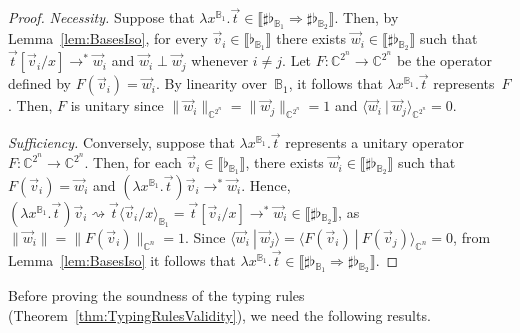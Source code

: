 \documentclass[a4paper,UKenglish,numberwithinsect,pdfa,anonymous]{lipics-v2021}
\theoremstyle{restatestyle}
\newcommand\lra{\longrightarrow}
\newcommand\ansubst[2]{\ensuremath{\langle #1 \rangle_{#2}}}
\def\C{\mathbb{C}}            %
\def\scal#1#2{\langle{#1}~|~{#2}\rangle}
\def\Lam#1#2#3{\lambda#1^{#2}{.}#3} %
\def\lraneq{\rightsquigarrow}
\def\eval{\lra^*}
\def\BB{\mathbb{B}}
\def\Arr{\Rightarrow}
\def\sem#1{\llbracket#1\rrbracket}
\newcommand\basis[1]{\ensuremath{\flat_{#1}}}
\begin{document}
\begin{proof}
  \textit{Necessity.}
  Suppose that $\Lam{x}{{\BB_1}}{\vec{t}}\in\sem{\sharp\basis{\BB_1}\Arr\sharp\basis{\BB_2}}$.
  Then, by Lemma~\ref{lem:BasesIso}, for every
  $\vec{v}_{i}\in\sem{\basis{\BB_1}}$ there exists
  $\vec{w}_{i}\in\sem{\sharp\basis{\BB_2}}$ such that
  $\vec{t}[\vec{v}_{i}/x]\eval\vec{w}_{i}$ and
  $\vec{w}_{i}\perp\vec{w}_{j}$ whenever $i\neq j$.
  Let $F:\C^{2^n}\to\C^{2^n}$ be the operator defined by
  $F(\vec{v}_{i})=\vec{w}_{i}$.
  By linearity over~$\BB_1$, it follows that
  $\Lam{x}{{\BB_1}}{\vec{t}}$ represents~$F$.
  Then, $F$ is unitary since
  $\|\vec{w}_{i}\|_{\C^{2^n}}=\|\vec{w}_{j}\|_{\C^{2^n}}=1$ and
  $\scal{\vec{w}_{i}}{\vec{w}_{j}}_{\C^{2^n}}=0$.

  \smallskip
  \textit{Sufficiency.}
  Conversely, suppose that $\Lam{x}{{\BB_1}}{\vec{t}}$ represents a
  unitary operator $F:\C^{2^n}\to\C^{2^n}$.
  Then, for each $\vec{v}_{i}\in\sem{\basis{\BB_1}}$, there exists
  $\vec{w}_{i}\in\sem{\sharp\basis{\BB_2}}$ such that
  $F(\vec{v}_{i}) = \vec{w}_{i}$ and
  $(\Lam{x}{{\BB_1}}{\vec{t}})\vec{v}_{i}\eval\vec{w}_{i}$.
  Hence,
  \(
    (\Lam{x}{{\BB_1}}{\vec{t}})\vec{v}_{i}
    \lraneq
    \vec{t}\ansubst{\vec{v}_{i}/x}{\BB_1}
    = \vec{t}[\vec{v}_{i}/x]
    \eval \vec{w}_{i}
    \in \sem{\sharp\basis{\BB_2}}
  \),
  as $\|\vec{w}_{i}\|=\|F(\vec{v}_{i})\|_{\C^n}=1$. Since
  \(
    \scal{\vec{w}_{i}}{\vec{w}_{j}}
    = \scal{F(\vec{v}_{i})}{F(\vec{v}_{j})}_{\C^n}
    = 0
  \),
  from Lemma~\ref{lem:BasesIso} it follows that
  $\Lam{x}{{\BB_1}}{\vec{t}}\in\sem{\sharp\basis{\BB_1}\Arr\sharp\basis{\BB_2}}$.
  \qedhere
\end{proof}


Before proving the soundness of the typing rules (Theorem~\ref{thm:TypingRulesValidity}), we need the following results.
\end{document}
